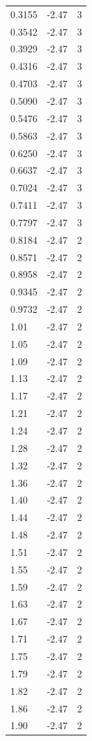\begin{longtable}{lrr}
  0.3155 & -2.47 & 3 \\
  0.3542 & -2.47 & 3 \\
  0.3929 & -2.47 & 3 \\
  0.4316 & -2.47 & 3 \\
  0.4703 & -2.47 & 3 \\
  0.5090 & -2.47 & 3 \\
  0.5476 & -2.47 & 3 \\
  0.5863 & -2.47 & 3 \\
  0.6250 & -2.47 & 3 \\
  0.6637 & -2.47 & 3 \\
  0.7024 & -2.47 & 3 \\
  0.7411 & -2.47 & 3 \\
  0.7797 & -2.47 & 3 \\
  0.8184 & -2.47 & 2 \\
  0.8571 & -2.47 & 2 \\
  0.8958 & -2.47 & 2 \\
  0.9345 & -2.47 & 2 \\
  0.9732 & -2.47 & 2 \\
  1.01 & -2.47 & 2 \\
  1.05 & -2.47 & 2 \\
  1.09 & -2.47 & 2 \\
  1.13 & -2.47 & 2 \\
  1.17 & -2.47 & 2 \\
  1.21 & -2.47 & 2 \\
  1.24 & -2.47 & 2 \\
  1.28 & -2.47 & 2 \\
  1.32 & -2.47 & 2 \\
  1.36 & -2.47 & 2 \\
  1.40 & -2.47 & 2 \\
  1.44 & -2.47 & 2 \\
  1.48 & -2.47 & 2 \\
  1.51 & -2.47 & 2 \\
  1.55 & -2.47 & 2 \\
  1.59 & -2.47 & 2 \\
  1.63 & -2.47 & 2 \\
  1.67 & -2.47 & 2 \\
  1.71 & -2.47 & 2 \\
  1.75 & -2.47 & 2 \\
  1.79 & -2.47 & 2 \\
  1.82 & -2.47 & 2 \\
  1.86 & -2.47 & 2 \\
  1.90 & -2.47 & 2 \\

\end{longtable}
